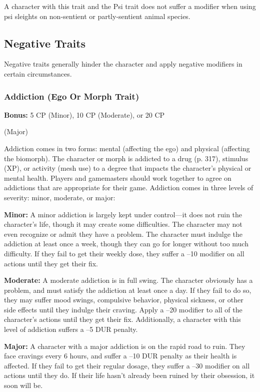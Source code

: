 A character with this trait and the Psi trait does 
not suffer a modifier when using psi sleights on non-sentient
or partly-sentient animal species.

\subsection{Negative Traits}


Negative traits generally hinder the character and 
apply negative modifiers in certain circumstances.

\subsubsection{Addiction (Ego Or Morph Trait)}

\textbf{Bonus:} 5 CP (Minor), 10 CP (Moderate), or 20 CP 

(Major)

Addiction comes in two forms: mental (affecting 
the ego) and physical (affecting the biomorph). The 
character or morph is addicted to a drug (p. 317), 
stimulus (XP), or activity (mesh use) to a degree that 
impacts the character's physical or mental health. 
Players and gamemasters should work together to 
agree on addictions that are appropriate for their 
game. Addiction comes in three levels of severity: 
minor, moderate, or major:

\textbf{Minor:} A minor addiction is largely kept under 
control—it does not ruin the character's life, though 
it may create some difficulties. The character may not 
even recognize or admit they have a problem. The 
character must indulge the addiction at least once 
a week, though they can go for longer without too 
much difficulty. If they fail to get their weekly dose, 
they suffer a –10 modifier on all actions until they get 
their fix.

\textbf{Moderate:} A moderate addiction is in full swing. 
The character obviously has a problem, and must 
satisfy the addiction at least once a day. If they fail 
to do so, they may suffer mood swings, compulsive 
behavior, physical sickness, or other side effects until 
they indulge their craving. Apply a –20 modifier to 
all of the character's actions until they get their fix. 
Additionally, a character with this level of addiction 
suffers a –5 DUR penalty.

\textbf{Major:} A character with a major addiction is on 
the rapid road to ruin. They face cravings every 6 
hours, and suffer a –10 DUR penalty as their health 
is affected. If they fail to get their regular dosage, they 
suffer a –30 modifier on all actions until they do. If 
their life hasn't already been ruined by their obsession, 
it soon will be.

